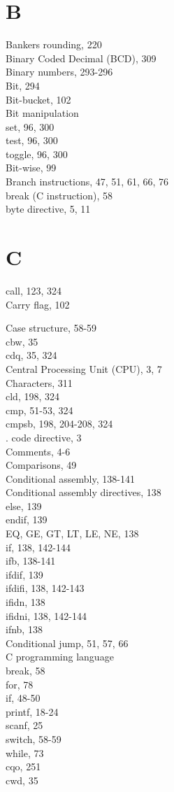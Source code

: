 \documentclass[10pt]{book}
\begin{document}
\section{B}
Bankers rounding, 220\\
Binary Coded Decimal (BCD), 309\\
Binary numbers, 293-296\\
Bit, 294\\
Bit-bucket, 102\\
Bit manipulation\\
set, 96, 300\\
test, 96, 300\\
toggle, 96, 300\\
Bit-wise, 99\\
Branch instructions, 47, 51, 61, 66, 76\\
break (C instruction), 58\\
byte directive, 5, 11

\section{C}
call, 123, 324\\
Carry flag, 102

Case structure, 58-59\\
cbw, 35\\
cdq, 35, 324\\
Central Processing Unit (CPU), 3, 7\\
Characters, 311\\
cld, 198, 324\\
cmp, 51-53, 324\\
cmpsb, 198, 204-208, 324\\
. code directive, 3\\
Comments, 4-6\\
Comparisons, 49\\
Conditional assembly, 138-141\\
Conditional assembly directives, 138\\
else, 139\\
endif, 139\\
EQ, GE, GT, LT, LE, NE, 138\\
if, 138, 142-144\\
ifb, 138-141\\
ifdif, 139\\
ifdifi, 138, 142-143\\
ifidn, 138\\
ifidni, 138, 142-144\\
ifnb, 138\\
Conditional jump, 51, 57, 66\\
C programming language\\
break, 58\\
for, 78\\
if, 48-50\\
printf, 18-24\\
scanf, 25\\
switch, 58-59\\
while, 73\\
cqo, 251\\
cwd, 35
\end{document}
